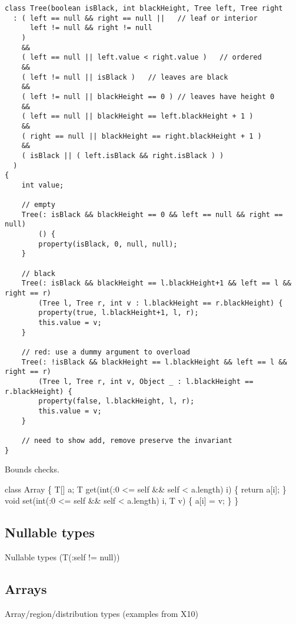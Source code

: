 \documentclass[nocopyrightspace,preprint,9pt]{sigplanconf}
\begin{document}
\begin{verbatim}
class Tree(boolean isBlack, int blackHeight, Tree left, Tree right
  : ( left == null && right == null ||   // leaf or interior
      left != null && right != null
    )
    &&
    ( left == null || left.value < right.value )   // ordered
    &&
    ( left != null || isBlack )   // leaves are black
    &&
    ( left != null || blackHeight == 0 ) // leaves have height 0
    &&
    ( left == null || blackHeight == left.blackHeight + 1 )
    &&
    ( right == null || blackHeight == right.blackHeight + 1 )
    &&
    ( isBlack || ( left.isBlack && right.isBlack ) )
  )
{
    int value;

    // empty
    Tree(: isBlack && blackHeight == 0 && left == null && right == null)
        () {
        property(isBlack, 0, null, null);
    }

    // black
    Tree(: isBlack && blackHeight == l.blackHeight+1 && left == l && right == r)
        (Tree l, Tree r, int v : l.blackHeight == r.blackHeight) {
        property(true, l.blackHeight+1, l, r);
        this.value = v;
    }
       
    // red: use a dummy argument to overload
    Tree(: !isBlack && blackHeight == l.blackHeight && left == l && right == r)
        (Tree l, Tree r, int v, Object _ : l.blackHeight == r.blackHeight) {
        property(false, l.blackHeight, l, r);
        this.value = v;
    }

    // need to show add, remove preserve the invariant
}
\end{verbatim}

Bounds checks.

\begin{code}
class Array \{
    T[] a;
    T get(int(:0 <= self \&\& self < a.length) i) \{ return a[i]; \}
    void set(int(:0 <= self \&\& self < a.length) i, T v) \{ a[i] = v; \}
\}
\end{code}

\subsection{Nullable types}

Nullable types (T(:self != null))

\subsection{Arrays}

Array/region/distribution types (examples from X10)
\end{document}
